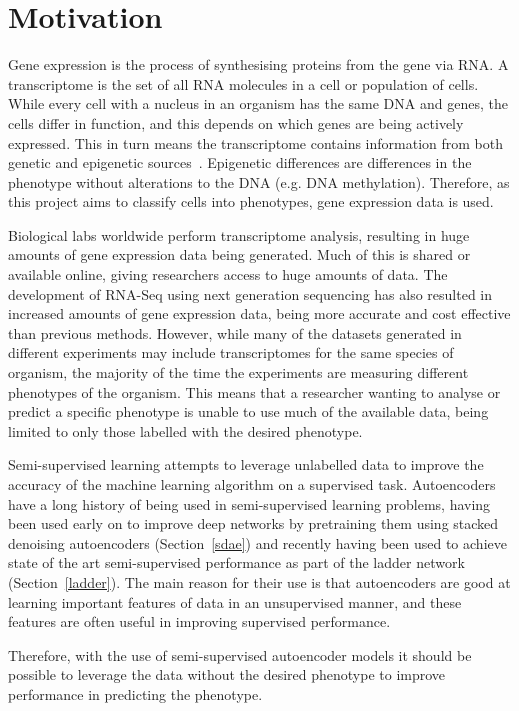 \documentclass[12pt,a4paper,twoside,openright]{report}
\begin{document}
\section{Motivation}

Gene expression is the process of synthesising proteins from the gene via RNA. A transcriptome is the set of all RNA 
molecules in a cell or population of cells. While every cell with a nucleus in an organism has the same DNA and genes, the cells
differ in function, and this depends on which genes are being actively expressed. This in turn means the
transcriptome contains information from both genetic and epigenetic sources~\cite{Gibney2010}. Epigenetic differences are differences
in the phenotype without alterations to the DNA (e.g. DNA methylation). Therefore, as this project aims to classify cells into phenotypes, 
gene expression data is used.

Biological labs worldwide perform transcriptome analysis, resulting in huge amounts of gene expression data being
generated. Much of this is shared or available online, giving researchers access to huge amounts of data. The development
of RNA-Seq using next generation sequencing has also resulted in increased amounts of gene expression data, being more 
accurate and cost effective than previous methods. However,
while many of the datasets generated in different experiments may include transcriptomes for the same species of organism,
the majority of the time the experiments are measuring different phenotypes of the organism. This means that a 
researcher wanting to analyse or predict a specific phenotype is unable to use much of the available data, being limited
to only those labelled with the desired phenotype.

Semi-supervised learning attempts to leverage unlabelled data to improve the accuracy of the machine learning
algorithm on a supervised task. Autoencoders have a long history of being used in semi-supervised learning problems,
having been used early on to improve deep networks by pretraining them using stacked denoising autoencoders (Section~\ref{sdae})
and recently having been used to achieve state of the art semi-supervised performance as part of the ladder 
network (Section~\ref{ladder}). The main reason for their use is that autoencoders are good at learning 
important features of data in an unsupervised manner, and these features are often useful in improving 
supervised performance.

Therefore, with the use of semi-supervised autoencoder models it should be possible to leverage the data without
the desired phenotype to improve performance in predicting the phenotype.
\end{document}
